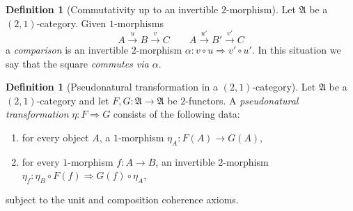 \documentclass[10pt, reqno]{amsart}
\theoremstyle{plain}
\theoremstyle{definition}
\newtheorem{definition}[theorem]{Definition}
\theoremstyle{plain}
\begin{document}
\begin{definition}[Commutativity up to an invertible $2$-morphism]\label{def:CommUpToDefect}
Let $\mathfrak{A}$ be a $(2,1)$-category. Given $1$-morphisms
\[
  A \xrightarrow{u} B \xrightarrow{v} C
  \qquad
  A \xrightarrow{u'} B' \xrightarrow{v'} C
\]
a \emph{comparison} is an invertible $2$-morphism $\alpha \colon v\circ u \Rightarrow v'\circ u'$. In this situation we say that the square \emph{commutes via $\alpha$}.
\end{definition}

\begin{definition}[Pseudonatural transformation in a $(2,1)$-category]\label{def:PseudoNatural}
Let $\mathfrak{A}$ be a $(2,1)$-category and let $F,G\colon\mathfrak{A}\to\mathfrak{A}$ be $2$-functors. A \emph{pseudonatural transformation} $\eta\colon F \Rightarrow G$ consists of the following data:
\begin{enumerate}
\item[\textup{(i)}] for every object $A$, a $1$-morphism $\eta_A\colon F(A)\to G(A)$,
\item[\textup{(ii)}] for every $1$-morphism $f\colon A\to B$, an invertible $2$-morphism $\eta_f \colon \eta_B\circ F(f)\Rightarrow G(f)\circ \eta_A$,
\end{enumerate}
subject to the unit and composition coherence axioms.
\end{definition}
\end{document}
